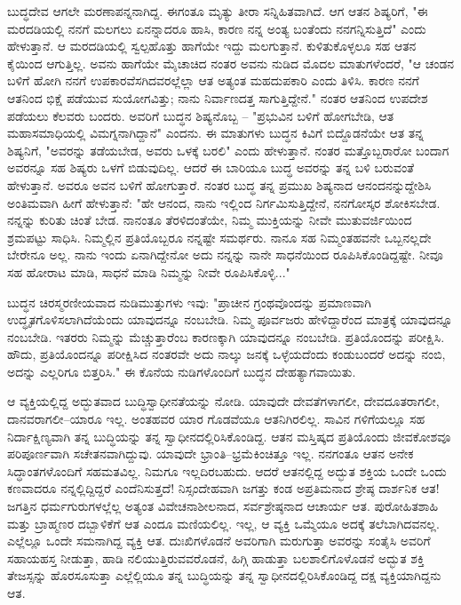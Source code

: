 ಬುದ್ಧದೇವ ಆಗಲೇ ಮರಣಾಪನ್ನನಾಗಿದ್ದ. ಈಗಂತೂ ಮೃತ್ಯು ತೀರಾ ಸನ್ನಿಹಿತವಾಗಿದೆ. ಆಗ ಆತನ ಶಿಷ್ಯರಿಗೆ, "ಈ ಮರದಡಿಯಲ್ಲಿ ನನಗೆ ಮಲಗಲು ಏನನ್ನಾದರೂ ಹಾಸಿ, ಕಾರಣ ನನ್ನ ಅಂತ್ಯ ಬಂತೆಂದು ನನಗನ್ನಿಸುತ್ತಿದೆ" ಎಂದು ಹೇಳುತ್ತಾನೆ. ಆ ಮರದಡಿಯಲ್ಲಿ ಸ್ವಲ್ಪಹೊತ್ತು ಹಾಗೆಯೇ ಇದ್ದು ಮಲಗುತ್ತಾನೆ. ಕುಳಿತುಕೊಳ್ಳಲೂ ಸಹ ಆತನ ಕೈಯಿಂದ ಆಗುತ್ತಿಲ್ಲ. ಅವನು ಹಾಗೆಯೇ ಮೈಚಾಚಿದ ನಂತರ ಅವನು ನುಡಿದ ಮೊದಲ ಮಾತುಗಳೆಂದರೆ, "ಆ ಚಂಡನ ಬಳಿಗೆ ಹೋಗಿ ನನಗೆ ಉಪಕಾರವೆಸಗಿದವರಲ್ಲೆಲ್ಲಾ ಆತ ಅತ್ಯಂತ ಮಹದುಪಕಾರಿ ಎಂದು ತಿಳಿಸಿ. ಕಾರಣ ನನಗೆ ಆತನಿಂದ ಭಿಕ್ಷೆ ಪಡೆಯುವ ಸುಯೋಗವಿತ್ತು; ನಾನು ನಿರ್ವಾಣದತ್ತ ಸಾಗುತ್ತಿದ್ದೇನೆ." ನಂತರ ಆತನಿಂದ ಉಪದೇಶ ಪಡೆಯಲು ಕೆಲವರು ಬಂದರು. ಅವರಿಗೆ ಬುದ್ಧನ ಶಿಷ್ಯನೊಬ್ಬ – "ಪ್ರಭುವಿನ ಬಳಿಗೆ ಹೋಗಬೇಡಿ, ಆತ ಮಹಾಸಮಾಧಿಯಲ್ಲಿ ವಿಮಗ್ನನಾಗಿದ್ದಾನೆ" ಎಂದನು. ಈ ಮಾತುಗಳು ಬುದ್ಧನ ಕಿವಿಗೆ ಬಿದ್ದೊಡನೆಯೇ ಆತ ತನ್ನ ಶಿಷ್ಯನಿಗೆ, "ಅವರನ್ನು ತಡೆಯಬೇಡ, ಅವರು ಒಳಕ್ಕೆ ಬರಲಿ" ಎಂದು ಹೇಳುತ್ತಾನೆ. ನಂತರ ಮತ್ತೊಬ್ಬರಾರೋ ಬಂದಾಗ ಅವರನ್ನೂ ಸಹ ಶಿಷ್ಯರು ಒಳಗೆ ಬಿಡುವುದಿಲ್ಲ. ಆದರೆ ಈ ಬಾರಿಯೂ ಬುದ್ಧ ಅವರನ್ನು ತನ್ನ ಬಳಿ ಬರುವಂತೆ ಹೇಳುತ್ತಾನೆ. ಅವರೂ ಅವನ ಬಳಿಗೆ ಹೋಗುತ್ತಾರೆ. ನಂತರ ಬುದ್ಧ ತನ್ನ ಪ್ರಮುಖ ಶಿಷ್ಯನಾದ ಆನಂದನನ್ನುದ್ದೇಶಿಸಿ ಅಂತಿಮವಾಗಿ ಹೀಗೆ ಹೇಳುತ್ತಾನೆ: "ಹೇ ಆನಂದ, ನಾನು ಇಲ್ಲಿಂದ ನಿರ್ಗಮಿಸುತ್ತಿದ್ದೇನೆ, ನನಗೋಸ್ಕರ ಶೋಕಿಸಬೇಡ. ನನ್ನನ್ನು ಕುರಿತು ಚಿಂತೆ ಬೇಡ. ನಾನಂತೂ ತೆರಳಿದಂತೆಯೇ, ನಿಮ್ಮ ಮುಕ್ತಿಯನ್ನು ನೀವೇ ಮುತುವರ್ಜಿಯಿಂದ ಶ್ರಮಪಟ್ಟು ಸಾಧಿಸಿ. ನಿಮ್ಮಲ್ಲಿನ ಪ್ರತಿಯೊಬ್ಬರೂ ನನ್ನಷ್ಟೇ ಸಮರ್ಥರು. ನಾನೂ ಸಹ ನಿಮ್ಮಂತಹವನೇ ಒಬ್ಬನಲ್ಲದೇ ಬೇರೇನೂ ಅಲ್ಲ. ನಾನು ಇಂದು ಏನಾಗಿದ್ದೇನೋ ಅದು ನನ್ನನ್ನು ನಾನೇ ಸಾಧನೆಯಿಂದ ರೂಪಿಸಿಕೊಂಡಿದ್ದಷ್ಟೇ. ನೀವೂ ಸಹ ಹೋರಾಟ ಮಾಡಿ, ಸಾಧನೆ ಮಾಡಿ ನಿಮ್ಮನ್ನು ನೀವೇ ರೂಪಿಸಿಕೊಳ್ಳಿ..."

ಬುದ್ಧನ ಚಿರಸ್ಮರಣೀಯವಾದ ನುಡಿಮುತ್ತುಗಳು ಇವು: "ಪ್ರಾಚೀನ ಗ್ರಂಥವೊಂದನ್ನು ಪ್ರಮಾಣವಾಗಿ ಉದ್ಧೃತಗೊಳಿಸಲಾಗಿದೆಯೆಂದು ಯಾವುದನ್ನೂ ನಂಬಬೇಡಿ. ನಿಮ್ಮ ಪೂರ್ವಜರು ಹೇಳಿದ್ದಾರೆಂದ ಮಾತ್ರಕ್ಕೆ ಯಾವುದನ್ನೂ ನಂಬಬೇಡಿ. ಇತರರು ನಿಮ್ಮನ್ನು ಮೆಚ್ಚುತ್ತಾರೆಂಬ ಕಾರಣಕ್ಕಾಗಿ ಯಾವುದನ್ನೂ ನಂಬಬೇಡಿ. ಪ್ರತಿಯೊಂದನ್ನು ಪರೀಕ್ಷಿಸಿ. ಹೌದು, ಪ್ರತಿಯೊಂದನ್ನೂ ಪರೀಕ್ಷಿಸಿದ ನಂತರವೇ ಅದು ನಾಲ್ಕು ಜನಕ್ಕೆ ಒಳ್ಳೆಯದೆಂದು ಕಂಡುಬಂದರೆ ಅದನ್ನು ನಂಬಿ, ಅದನ್ನು ಎಲ್ಲರಿಗೂ ಬಿತ್ತರಿಸಿ." ಈ ಕೊನೆಯ ನುಡಿಗಳೊಂದಿಗೆ ಬುದ್ಧನ ದೇಹತ್ಯಾಗವಾಯಿತು.

ಆ ವ್ಯಕ್ತಿಯಲ್ಲಿದ್ದ ಅದ್ಭುತವಾದ ಬುದ್ಧಿಸ್ವಾಧೀನತೆಯನ್ನು ನೋಡಿ. ಯಾವುದೇ ದೇವತೆಗಳಾಗಲೀ, ದೇವದೂತರಾಗಲೀ, ದಾನವರಾಗಲೀ–ಯಾರೂ ಇಲ್ಲ. ಅಂತಹವರ ಯಾರ ಗೊಡವೆಯೂ ಆತನಿಗಿರಲಿಲ್ಲ. ಸಾವಿನ ಗಳಿಗೆಯಲ್ಲೂ ಸಹ ನಿರ್ದಾಕ್ಷಿಣ್ಯವಾಗಿ ತನ್ನ ಬುದ್ಧಿಯನ್ನು ತನ್ನ ಸ್ವಾಧೀನದಲ್ಲಿರಿಸಿಕೊಂಡಿದ್ದ. ಆತನ ಮಸ್ತಿಷ್ಕದ ಪ್ರತಿಯೊಂದು ಜೀವಕೋಶವೂ ಪರಿಪೂರ್ಣವಾಗಿ ಸಚೇತನವಾಗಿದ್ದುವು. ಯಾವುದೇ ಭ್ರಾಂತಿ–ಭ್ರಮೆಕಿಂಚಿತ್ತೂ ಇಲ್ಲ. ನನಗಂತೂ ಆತನ ಅನೇಕ ಸಿದ್ಧಾಂತಗಳೊಂದಿಗೆ ಸಹಮತವಿಲ್ಲ. ನಿಮಗೂ ಇಲ್ಲದಿರಬಹುದು. ಆದರೆ ಆತನಲ್ಲಿದ್ದ ಅದ್ಭುತ ಶಕ್ತಿಯ ಒಂದೇ ಒಂದು ಕಣವಾದರೂ ನನ್ನಲ್ಲಿದ್ದಿದ್ದರೆ ಎಂದೆನಿಸುತ್ತದೆ! ನಿಸ್ಸಂದೇಹವಾಗಿ ಜಗತ್ತು ಕಂಡ ಅಪ್ರತಿಮನಾದ ಶ್ರೇಷ್ಠ ದಾರ್ಶನಿಕ ಆತ! ಜಗತ್ತಿನ ಧರ್ಮಗುರುಗಳಲ್ಲೆಲ್ಲ ಅತ್ಯಂತ ವಿವೇಚನಾಶೀಲನಾದ, ಸರ್ವಶ್ರೇಷ್ಠನಾದ ಆಚಾರ್ಯ ಆತ. ಪುರೋಹಿತಶಾಹಿ ಮತ್ತು ಬ್ರಾಹ್ಮಣರ ದಬ್ಬಾಳಿಕೆಗೆ ಆತ ಎಂದೂ ಮಣಿಯಲಿಲ್ಲ. ಇಲ್ಲ, ಆ ವ್ಯಕ್ತಿ ಒಮ್ಮೆಯೂ ಅದಕ್ಕೆ ತಲೆಬಾಗಿದವನಲ್ಲ. ಎಲ್ಲೆಲ್ಲೂ ಒಂದೇ ಸಮನಾಗಿದ್ದ ವ್ಯಕ್ತಿ ಆತ. ದುಃಖಿಗಳೊಡನೆ ಅವರಿಗಾಗಿ ಮರುಗುತ್ತಾ ಅವರನ್ನು ಸಂತೈಸಿ ಅವರಿಗೆ ಸಹಾಯಹಸ್ತ ನೀಡುತ್ತಾ, ಹಾಡಿ ನಲಿಯುತ್ತಿರುವವರೊಡನೆ, ಹಿಗ್ಗಿ ಹಾಡುತ್ತಾ ಬಲಶಾಲಿಗೊಳೊಡನೆ ಅದ್ಭುತ ಶಕ್ತಿ ತೇಜಸ್ಸನ್ನು ಹೊರಸೂಸುತ್ತಾ ಎಲ್ಲೆಲ್ಲಿಯೂ ತನ್ನ ಬುದ್ಧಿಯನ್ನು ತನ್ನ ಸ್ವಾಧೀನದಲ್ಲಿರಿಸಿಕೊಂಡಿದ್ದ ದಕ್ಷ ವ್ಯಕ್ತಿಯಾಗಿದ್ದನು ಆತ.

